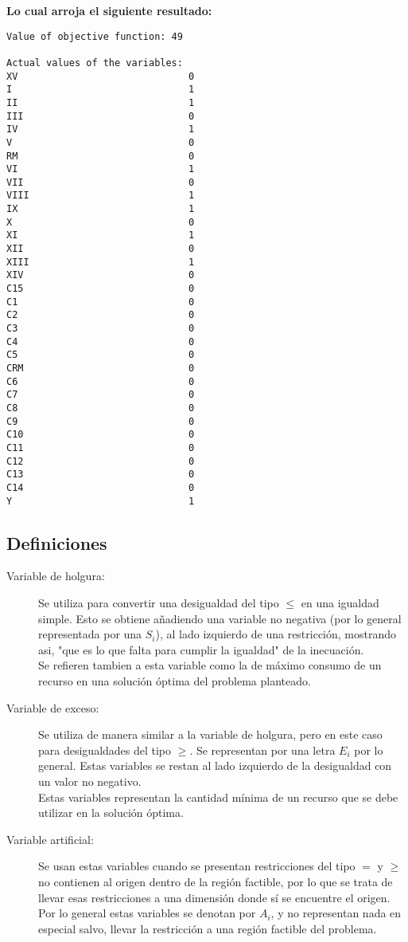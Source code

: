 \documentclass[12pt,letterpaper]{article}
\begin{document}
\textbf{Lo cual arroja el siguiente resultado:}
\begin{verbatim}
Value of objective function: 49

Actual values of the variables:
XV                              0
I                               1
II                              1
III                             0
IV                              1
V                               0
RM                              0
VI                              1
VII                             0
VIII                            1
IX                              1
X                               0
XI                              1
XII                             0
XIII                            1
XIV                             0
C15                             0
C1                              0
C2                              0
C3                              0
C4                              0
C5                              0
CRM                             0
C6                              0
C7                              0
C8                              0
C9                              0
C10                             0
C11                             0
C12                             0
C13                             0
C14                             0
Y                               1
\end{verbatim}

\subsection{Definiciones}
\begin{description}
\item[Variable de holgura:] Se utiliza para convertir una desigualdad del tipo $\leq$ en una igualdad simple. Esto se obtiene añadiendo una variable no negativa (por lo general representada por una $S_i$), al lado izquierdo de una restricción, mostrando asi, "que es lo que falta para cumplir la igualdad" de la inecuación.\\
Se refieren tambien a esta variable como la de máximo consumo de un recurso en una solución óptima del problema planteado.
\item[Variable de exceso:] Se utiliza de manera similar a la variable de holgura, pero en este caso para desigualdades del tipo $\geq$. Se representan por una letra $E_i$ por lo general. Estas variables se restan al lado izquierdo de la desigualdad con un valor no negativo.\\
Estas variables representan la cantidad mínima de un recurso que se debe utilizar en la solución óptima.
\item[Variable artificial:] Se usan estas variables cuando se presentan restricciones del tipo $=$ y $\geq$ no contienen al origen dentro de la región factible, por lo que se trata de llevar esas restricciones a una dimensión donde sí se encuentre el origen.\\
Por lo general estas variables se denotan por $A_i$, y no representan nada en especial salvo, llevar la restricción a una región factible del problema.
\end{description}




\end{document}
